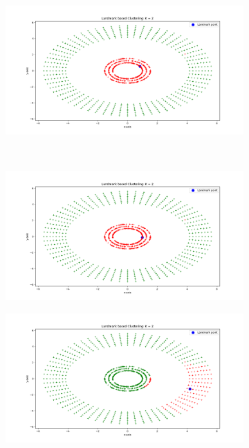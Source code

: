 \documentclass[a4paper,11pt]{article}
\begin{document}
\begin{mlsolution}
\begin{figure}[!htbp]
\begin{subfigure}{0.5\textwidth}
		\caption{}
		\label{l5}
	\end{subfigure}
	\begin{subfigure}{0.5\textwidth}
		\centering
		\includegraphics[width=1.1\textwidth]{images/l_random6.png}
		\caption{}
		\label{l6}
	\end{subfigure}
\\
	\begin{subfigure}{0.5\textwidth}
		\centering
		\includegraphics[width=1.1\textwidth]{images/l_random7.png}
		\caption{}
		\label{l7}
	\end{subfigure}
	\begin{subfigure}{0.5\textwidth}
		\centering
		\includegraphics[width=1.1\textwidth]{images/l_random8.png}

\end{subfigure}
\end{figure}
\end{mlsolution}
\end{document}
